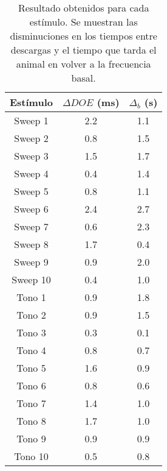 \begin{table}[H]
\centering
\begin{tabular}{c|c|c}
\doublerule
Estímulo & $\Delta DOE$ (ms) & $\Delta_b$ (s) \\	\midrule
Sweep 1  & 2.2               & 1.1            \\
Sweep 2  & 0.8               & 1.5            \\
Sweep 3  & 1.5               & 1.7            \\
Sweep 4  & 0.4               & 1.4            \\
Sweep 5  & 0.8               & 1.1            \\
Sweep 6  & 2.4               & 2.7            \\
Sweep 7  & 0.6               & 2.3            \\
Sweep 8  & 1.7               & 0.4            \\
Sweep 9  & 0.9               & 2.0            \\
Sweep 10 & 0.4               & 1.0            \\	\midrule
Tono 1   & 0.9              & 1.8            \\
Tono 2   & 0.9               & 1.5            \\
Tono 3   & 0.3               & 0.1            \\
Tono 4   & 0.8               & 0.7            \\
Tono 5   & 1.6               & 0.9            \\
Tono 6   & 0.8               & 0.6            \\
Tono 7   & 1.4               & 1.0            \\
Tono 8   & 1.7               & 1.0            \\
Tono 9   & 0.9               & 0.9            \\
Tono 10  & 0.5               & 0.8            \\	\bottomrule 
\end{tabular}%
\caption{Resultado obtenidos para cada estímulo. Se muestran las disminuciones en los tiempos entre descargas y el tiempo que tarda el animal en volver a la frecuencia basal.}
\label{tab:rescompo}
\end{table}
